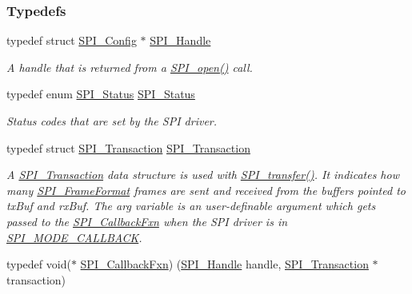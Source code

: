 \subsubsection*{Typedefs}
\begin{DoxyCompactItemize}
\item 
typedef struct \hyperlink{struct_s_p_i___config}{S\+P\+I\+\_\+\+Config} $\ast$ \hyperlink{_s_p_i_8h_a728806534c3c3e8675cfbfb7d8e36f13}{S\+P\+I\+\_\+\+Handle}
\begin{DoxyCompactList}\small\item\em A handle that is returned from a \hyperlink{_s_p_i_8h_a62cfe494cb1df47cd602e8747e894fd1}{S\+P\+I\+\_\+open()} call. \end{DoxyCompactList}\item 
typedef enum \hyperlink{_s_p_i_8h_a913c57c335166de9caa54b7eb9ad95fb}{S\+P\+I\+\_\+\+Status} \hyperlink{_s_p_i_8h_adf1c6e6f919dd9f6887da6590a52fd6a}{S\+P\+I\+\_\+\+Status}
\begin{DoxyCompactList}\small\item\em Status codes that are set by the S\+P\+I driver. \end{DoxyCompactList}\item 
typedef struct \hyperlink{struct_s_p_i___transaction}{S\+P\+I\+\_\+\+Transaction} \hyperlink{_s_p_i_8h_a906af7b4126dcfc52dfa905eb08408fc}{S\+P\+I\+\_\+\+Transaction}
\begin{DoxyCompactList}\small\item\em A \hyperlink{struct_s_p_i___transaction}{S\+P\+I\+\_\+\+Transaction} data structure is used with \hyperlink{_s_p_i_8h_a989e17f96b54fcc3dc2cac5f8ac6bdb2}{S\+P\+I\+\_\+transfer()}. It indicates how many \hyperlink{_s_p_i_8h_a53949638d43ae7bf71b74c2b136ad206}{S\+P\+I\+\_\+\+Frame\+Format} frames are sent and received from the buffers pointed to tx\+Buf and rx\+Buf. The arg variable is an user-\/definable argument which gets passed to the \hyperlink{_s_p_i_8h_a207e2d5a7e7ea5606b6995b6485ca015}{S\+P\+I\+\_\+\+Callback\+Fxn} when the S\+P\+I driver is in \hyperlink{_s_p_i_8h_ab9ea76c6529d6076eee5e1c4a5a92c6fa5631e69925c47a62a261c78ebbda39fb}{S\+P\+I\+\_\+\+M\+O\+D\+E\+\_\+\+C\+A\+L\+L\+B\+A\+C\+K}. \end{DoxyCompactList}\item 
typedef void($\ast$ \hyperlink{_s_p_i_8h_a207e2d5a7e7ea5606b6995b6485ca015}{S\+P\+I\+\_\+\+Callback\+Fxn}) (\hyperlink{_s_p_i_8h_a728806534c3c3e8675cfbfb7d8e36f13}{S\+P\+I\+\_\+\+Handle} handle, \hyperlink{struct_s_p_i___transaction}{S\+P\+I\+\_\+\+Transaction} $\ast$transaction)

\end{DoxyCompactItemize}
